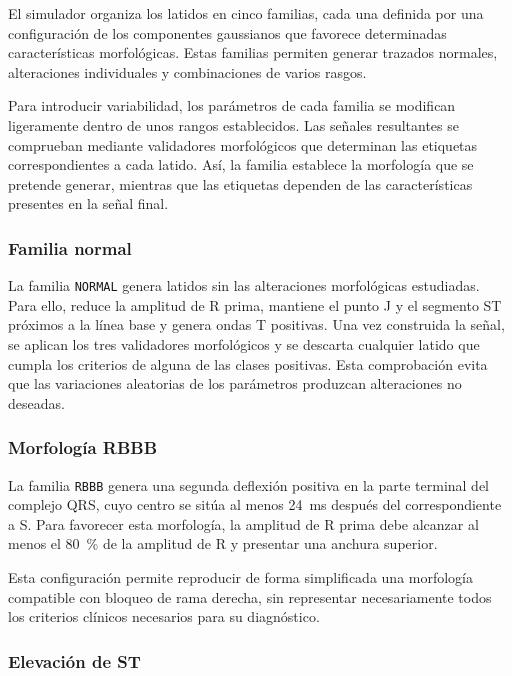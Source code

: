 El simulador organiza los latidos en cinco familias, cada una definida por una configuración de los componentes gaussianos que favorece determinadas características morfológicas. Estas familias permiten generar trazados normales, alteraciones individuales y combinaciones de varios rasgos.

Para introducir variabilidad, los parámetros de cada familia se modifican ligeramente dentro de unos rangos establecidos. Las señales resultantes se comprueban mediante validadores morfológicos que determinan las etiquetas correspondientes a cada latido. Así, la familia establece la morfología que se pretende generar, mientras que las etiquetas dependen de las características presentes en la señal final.

\subsubsection{Familia normal}

La familia \texttt{NORMAL} genera latidos sin las alteraciones morfológicas estudiadas. Para ello, reduce la amplitud de R prima, mantiene el punto J y el segmento ST próximos a la línea base y genera ondas T positivas. Una vez construida la señal, se aplican los tres validadores morfológicos y se descarta cualquier latido que cumpla los criterios de alguna de las clases positivas. Esta comprobación evita que las variaciones aleatorias de los parámetros produzcan alteraciones no deseadas.

\subsubsection{Morfología RBBB}

La familia \texttt{RBBB} genera una segunda deflexión positiva en la parte terminal del complejo QRS, cuyo centro se sitúa al menos 24~ms después del correspondiente a S. Para favorecer esta morfología, la amplitud de R prima debe alcanzar al menos el 80~\% de la amplitud de R y presentar una anchura superior.

Esta configuración permite reproducir de forma simplificada una morfología compatible con bloqueo de rama derecha, sin representar necesariamente todos los criterios clínicos necesarios para su diagnóstico.

\subsubsection{Elevación de ST}

